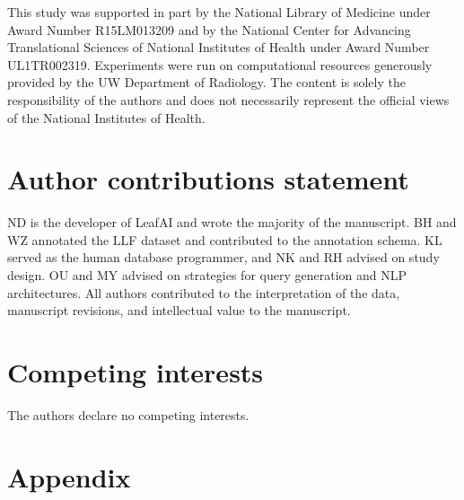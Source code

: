 \documentclass[sort&compress, numafflabel]{elsarticle}
\begin{document}
This study was supported in part by the National Library of Medicine under Award Number R15LM013209 and by the National Center for Advancing Translational Sciences of National Institutes of Health under Award Number UL1TR002319. Experiments were run on computational resources generously provided by the UW Department of Radiology. The content is solely the responsibility of the authors and does not necessarily represent the official views of the National Institutes of Health. 

\section*{Author contributions statement}

ND is the developer of LeafAI and wrote the majority of the manuscript. BH and WZ annotated the LLF dataset and contributed to the annotation schema. KL served as the human database programmer, and NK and RH advised on study design. OU and MY advised on strategies for query generation and NLP architectures. All authors contributed to the interpretation of the data, manuscript revisions, and intellectual value to the manuscript.

\section*{Competing interests}

The authors declare no competing interests.



\section*{Appendix}
\label{sec:appendix}


\end{document}
